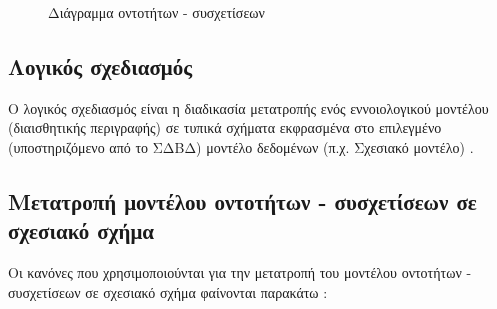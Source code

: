 \documentclass{assignment}
\begin{document}
\begin{landscape}
\begin{figure}
\begin{center}
\caption{Διάγραμμα οντοτήτων - συσχετίσεων}
\label{fig:ER:diagram}
\end{center}
\end{figure}
\end{landscape}

\subsection{Λογικός σχεδιασμός}

Ο λογικός σχεδιασμός είναι η διαδικασία μετατροπής ενός εννοιολογικού μοντέλου (διαισθητικής περιγραφής) σε τυπικά σχήματα εκφρασμένα στο επιλεγμένο (υποστηριζόμενο από το ΣΔΒΔ) μοντέλο δεδομένων (π.χ. Σχεσιακό μοντέλο) \cite{theodoridis_class_notes}.

\subsection{Μετατροπή μοντέλου οντοτήτων - συσχετίσεων σε σχεσιακό σχή\-μα}

Οι κανόνες που χρησιμοποιούνται για την μετατροπή του μοντέλου οντοτήτων - συσχετίσεων σε σχεσιακό σχήμα φαίνονται παρακάτω \cite{theodoridis_class_notes}:
\end{document}

